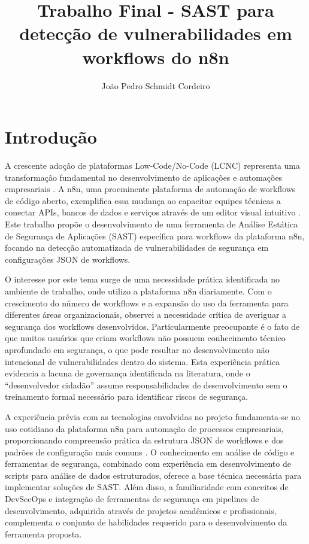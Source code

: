 \documentclass{sftex}
\title{Trabalho Final - SAST para detecção de vulnerabilidades em workflows do n8n}
\author{João Pedro Schmidt Cordeiro}
\begin{document}
\maketitle
\tableofcontents
\newpage

\section{Introdução}

A crescente adoção de plataformas Low-Code/No-Code (LCNC) representa uma transformação fundamental no desenvolvimento de aplicações e automações empresariais \cite{n8n_workflow_automation}. A n8n, uma proeminente plataforma de automação de workflows de código aberto, exemplifica essa mudança ao capacitar equipes técnicas a conectar APIs, bancos de dados e serviços através de um editor visual intuitivo \cite{n8n_platform}. Este trabalho propõe o desenvolvimento de uma ferramenta de Análise Estática de Segurança de Aplicações (SAST) específica para workflows da plataforma n8n, focando na detecção automatizada de vulnerabilidades de segurança em configurações JSON de workflows.

O interesse por este tema surge de uma necessidade prática identificada no ambiente de trabalho, onde utilizo a plataforma n8n diariamente. Com o crescimento do número de workflows e a expansão do uso da ferramenta para diferentes áreas organizacionais, observei a necessidade crítica de averiguar a segurança dos workflows desenvolvidos. Particularmente preocupante é o fato de que muitos usuários que criam workflows não possuem conhecimento técnico aprofundado em segurança, o que pode resultar no desenvolvimento não intencional de vulnerabilidades dentro do sistema. Esta experiência prática evidencia a lacuna de governança identificada na literatura, onde o “desenvolvedor cidadão” assume responsabilidades de desenvolvimento sem o treinamento formal necessário para identificar riscos de segurança.

A experiência prévia com as tecnologias envolvidas no projeto fundamenta-se no uso cotidiano da plataforma n8n para automação de processos empresariais, proporcionando compreensão prática da estrutura JSON de workflows e dos padrões de configuração mais comuns \cite{n8n_ai_coding}. O conhecimento em análise de código e ferramentas de segurança, combinado com experiência em desenvolvimento de scripts para análise de dados estruturados, oferece a base técnica necessária para implementar soluções de SAST. Além disso, a familiaridade com conceitos de DevSecOps e integração de ferramentas de segurança em pipelines de desenvolvimento, adquirida através de projetos acadêmicos e profissionais, complementa o conjunto de habilidades requerido para o desenvolvimento da ferramenta proposta.
\end{document}
